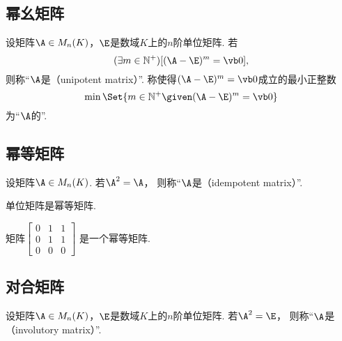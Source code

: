 \subsection{幂幺矩阵}
\begin{definition}
设矩阵\(\A \in M_n(K)\)，\(\E\)是数域\(K\)上的\(n\)阶单位矩阵.
若\[
	(\exists m\in\mathbb{N}^+)
	[(\A-\E)^m=\vb0],
\]
则称“\(\A\)是（unipotent matrix）”.
称使得\((\A-\E)^m=\vb0\)成立的最小正整数\[
    \min\Set{ m\in\mathbb{N}^+ \given (\A-\E)^m=\vb0 }
\]为“\(\A\)的”.
\end{definition}

\subsection{幂等矩阵}
\begin{definition}\label{definition:幂等矩阵.幂等矩阵的定义}
设矩阵\(\A \in M_n(K)\).
若\(\A^2=\A\)，
则称“\(\A\)是（idempotent matrix）”.
\end{definition}

\begin{example}
单位矩阵是幂等矩阵.
\end{example}

\begin{example}
矩阵\begin{math}
	\begin{bmatrix}
		0 & 1 & 1 \\
		0 & 1 & 1 \\
		0 & 0 & 0
	\end{bmatrix}
\end{math}
是一个幂等矩阵.
\end{example}

\subsection{对合矩阵}
\begin{definition}
设矩阵\(\A \in M_n(K)\)，\(\E\)是数域\(K\)上的\(n\)阶单位矩阵.
若\(\A^2=\E\)，
则称“\(\A\)是（involutory matrix）”.
\end{definition}

